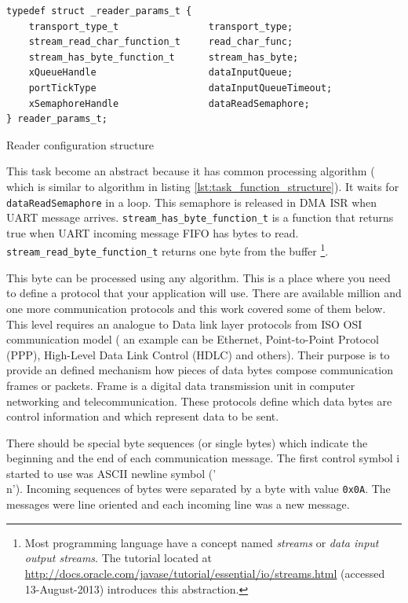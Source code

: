 \begin{listing}[H]
\begin{verbatim}
typedef struct _reader_params_t {
	transport_type_t				transport_type;
	stream_read_char_function_t		read_char_func;
	stream_has_byte_function_t		stream_has_byte;
	xQueueHandle					dataInputQueue;
	portTickType					dataInputQueueTimeout;
	xSemaphoreHandle				dataReadSemaphore;
} reader_params_t;
\end{verbatim}
\caption{Reader configuration structure}
\label{lst:reader_config_structure}
\end{listing}

This task become an abstract because it has common processing algorithm ( which
is similar to algorithm in listing \ref{lst:task_function_structure}).
It waits for \texttt{dataReadSemaphore} in a loop. 
This semaphore is released in DMA \gls{ISR} when UART message arrives.
\texttt{stream\_has\_byte\_function\_t} is a function that returns true
when UART incoming message FIFO has bytes to read. 
\texttt{stream\_read\_byte\_function\_t} returns one byte from the buffer
\footnote{Most programming language have a concept named \textit{streams} or
\textit{data input output streams}. The tutorial located at
\url{http://docs.oracle.com/javase/tutorial/essential/io/streams.html}
(accessed 13-August-2013) introduces this abstraction.}.

This byte can be processed using any algorithm. This is a place where you need
to define a protocol that your application will use.
There are available million and one more communication protocols and this work
covered some of them below. 
This level requires an analogue to  Data link
layer protocols from ISO OSI communication model 
( an example can be Ethernet, Point-to-Point Protocol (PPP), High-Level Data
Link Control (HDLC)  and others). 
Their purpose is to provide an defined
mechanism how pieces of data bytes compose communication frames or packets. 
Frame is a digital data transmission unit in computer networking and
telecommunication. These protocols define which data bytes are control
information and which represent data to be sent.

There should be special byte sequences (or single bytes) which indicate the 
beginning and the end of each communication message. 
The first control symbol i started to use was ASCII newline symbol ('\\n').
Incoming sequences of bytes were separated by a byte with value \texttt{0x0A}.
The messages were line oriented and each incoming line was a new message.

